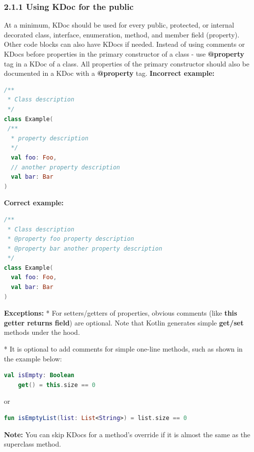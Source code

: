 \subsubsection*{\textbf{2.1.1 Using KDoc for the public}}
\leavevmode\newline
\label{sec:2.1.1}
At a minimum, KDoc should be used for every public, protected, or internal decorated class, interface, enumeration, method, and member field (property).
Other code blocks can also have KDocs if needed.
Instead of using comments or KDocs before properties in the primary constructor of a class - use \textbf{@property} tag in a KDoc of a class.
All properties of the primary constructor should also be documented in a KDoc with a \textbf{@property} tag.
\textbf{Incorrect example:}
\begin{lstlisting}[language=Kotlin]
/**
 * Class description
 */
class Example(
 /**
  * property description
  */
  val foo: Foo,
  // another property description
  val bar: Bar
)
\end{lstlisting}
\textbf{Correct example:}
\begin{lstlisting}[language=Kotlin]
/**
 * Class description
 * @property foo property description
 * @property bar another property description
 */
class Example(
  val foo: Foo,
  val bar: Bar
)
\end{lstlisting}
\textbf{Exceptions:}
* For setters/getters of properties, obvious comments (like \textbf{this getter returns field}) are optional. Note that Kotlin generates simple \textbf{get/set} methods under the hood.

* It is optional to add comments for simple one-line methods, such as shown in the example below:
\begin{lstlisting}[language=Kotlin]
val isEmpty: Boolean
    get() = this.size == 0
\end{lstlisting}
or
\begin{lstlisting}[language=Kotlin]
fun isEmptyList(list: List<String>) = list.size == 0
\end{lstlisting}
\textbf{Note:} You can skip KDocs for a method's override if it is almost the same as the superclass method.
